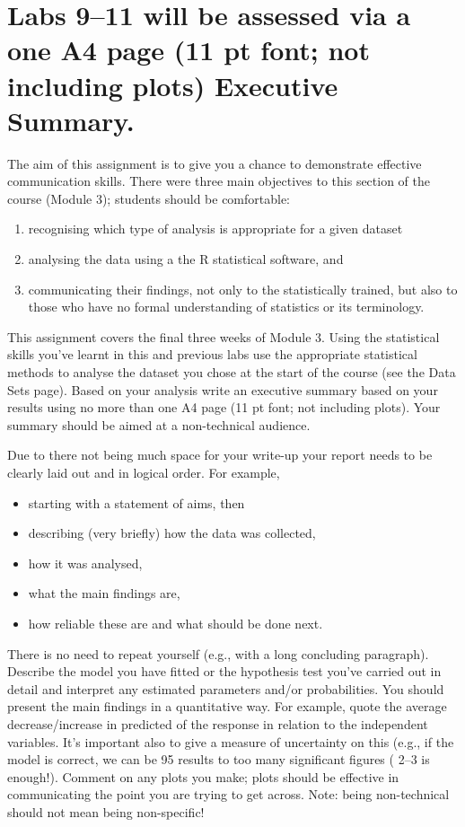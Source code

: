 \documentclass{article}
\begin{document}
\newpage

\section*{Labs 9--11 will be assessed via a one A4 page (11 pt font; not including plots) Executive Summary.}

The aim of this assignment is to give you a chance to demonstrate effective communication skills. There were three main objectives to this section of the course (Module 3); students should be comfortable:
\begin{enumerate}
\item recognising which type of analysis is appropriate for a given dataset
\item analysing the data using a the R statistical software, and
\item communicating their findings, not only to the statistically trained, but also to those who have no formal understanding of statistics or its terminology.
\end{enumerate}

This assignment covers the final three weeks of  Module 3. Using the statistical skills you've learnt in this and previous labs use the appropriate statistical methods to analyse the dataset you chose at the start of the course (see the Data Sets page). Based on your analysis write an executive summary based on  your results using no more than one A4 page (11 pt font; not including plots). Your summary should be aimed at a non-technical audience.

Due to there not being much space for your write-up your report needs to be clearly laid out and in logical order. For example,

\begin{itemize}
\item starting with a statement of aims, then
\item describing (very briefly) how the data was collected,
\item how it was analysed,
\item what the main findings are,
\item how reliable these are and what should be done next.
\end{itemize}

There is no need to repeat yourself (e.g., with a long concluding paragraph). Describe the model you have fitted or the hypothesis test you've carried out in detail and interpret any estimated parameters and/or probabilities. You should present the main findings in a quantitative way. For example, quote the average decrease/increase in predicted of the response in relation to the independent variables. It’s important also to give a measure of uncertainty on this (e.g., if the model is correct, we can be 95%
results to too many significant figures ( 2--3 is enough!). Comment on any plots you make; plots should be effective in communicating the point you are trying to get across. Note: being non-technical should not mean being non-specific!
\end{document}
